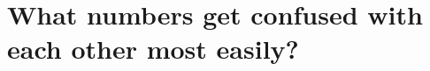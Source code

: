 \documentclass[11pt]{article}
\begin{document}

\section{What numbers get confused with each other most easily?}
\end{document}
